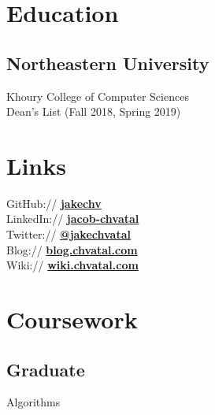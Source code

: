 \documentclass[letterpaper]{resume} %
\begin{document}
\begin{minipage}[t]{0.33\textwidth} %

\section{Education}
\subsection{Northeastern University}
Khoury College of Computer Sciences \\
Dean's List (Fall 2018, Spring 2019) \\
 \sectionspace %

\section{Links}
GitHub:// \href{https://github.com/jakechv}{\bf jakechv} \\
LinkedIn:// \href{https://www.linkedin.com/in/jacob-chvatal}{\bf jacob-chvatal} \\
Twitter:// \href{https://twitter.com/jakechvatal}{\bf @jakechvatal} \\
Blog:// \href{https://blog.chvatal.com}{\bf blog.chvatal.com} \\
Wiki:// \href{https://wiki.chvatal.com}{\bf wiki.chvatal.com} \\
\sectionspace

\section{Coursework}
\subsection{Graduate}
Algorithms
\sectionspace


\end{minipage}
\end{document}
